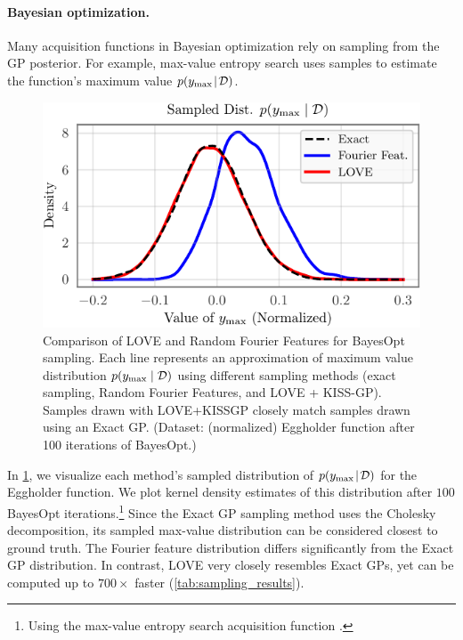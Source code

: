 \paragraph{Bayesian optimization.}
Many acquisition functions in Bayesian optimization rely on sampling from the GP posterior.
For example, max-value entropy search \cite{wang2017max} uses samples to estimate the function's maximum value $p(y_\text{max} \! \mid \! \mathcal D)$.
%
\begin{figure}[t!]
  \centering
  \includegraphics[width=0.65\columnwidth]{figures/love_sampling_comparison.pdf}
  \caption[Comparison of LOVE and Random Fourier Features for BayesOpt sampling.]{
    Comparison of LOVE and Random Fourier Features for BayesOpt sampling.
    Each line represents an approximation of maximum value distribution $p(y_\text{max} \mid \mathcal D)$ using different sampling methods (exact sampling, Random Fourier Features, and LOVE + KISS-GP).
    Samples drawn with LOVE+KISSGP closely match samples drawn using an Exact GP.
    (Dataset: (normalized) Eggholder function after 100 iterations of BayesOpt.)
    \label{fig:love_sampling_comparison}
  }
\end{figure}
%
In \cref{fig:love_sampling_comparison}, we visualize each method's sampled distribution of $p(y_\text{max} \! \mid \! \mathcal D)$ for the Eggholder function.
We plot kernel density estimates of this distribution after $100$ BayesOpt iterations.\footnote{
  Using the max-value entropy search acquisition function \citep{wang2017max}.
}
Since the Exact GP sampling method uses the Cholesky decomposition, its sampled max-value distribution can be considered closest to ground truth.
The Fourier feature distribution differs significantly from the Exact GP distribution.
In contrast, LOVE{} very closely resembles Exact GPs, yet can be computed up to $700 \times$ faster (\cref{tab:sampling_results}).
